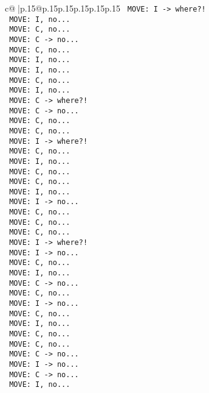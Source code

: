 \documentclass{article}
\begin{document}
{\begin{supertabular}{c@{$\;$}|p{.15\linewidth}@{}p{.15\linewidth}p{.15\linewidth}p{.15\linewidth}p{.15\linewidth}p{.15\linewidth}}
{{{\texttt{ MOVE: I {-}> where?!} \\
\texttt{ MOVE: I, no...} \\
\texttt{ MOVE: C, no...} \\
\texttt{ MOVE: C {-}> no...} \\
\texttt{ MOVE: C, no...} \\
\texttt{ MOVE: I, no...} \\
\texttt{ MOVE: I, no...} \\
\texttt{ MOVE: C, no...} \\
\texttt{ MOVE: I, no...} \\
\texttt{ MOVE: C {-}> where?!} \\
\texttt{ MOVE: C {-}> no...} \\
\texttt{ MOVE: C, no...} \\
\texttt{ MOVE: C, no...} \\
\texttt{ MOVE: I {-}> where?!} \\
\texttt{ MOVE: C, no...} \\
\texttt{ MOVE: I, no...} \\
\texttt{ MOVE: C, no...} \\
\texttt{ MOVE: C, no...} \\
\texttt{ MOVE: I, no...} \\
\texttt{ MOVE: I {-}> no...} \\
\texttt{ MOVE: C, no...} \\
\texttt{ MOVE: C, no...} \\
\texttt{ MOVE: C, no...} \\
\texttt{ MOVE: I {-}> where?!} \\
\texttt{ MOVE: I {-}> no...} \\
\texttt{ MOVE: C, no...} \\
\texttt{ MOVE: I, no...} \\
\texttt{ MOVE: C {-}> no...} \\
\texttt{ MOVE: C, no...} \\
\texttt{ MOVE: I {-}> no...} \\
\texttt{ MOVE: C, no...} \\
\texttt{ MOVE: I, no...} \\
\texttt{ MOVE: C, no...} \\
\texttt{ MOVE: C, no...} \\
\texttt{ MOVE: C {-}> no...} \\
\texttt{ MOVE: I {-}> no...} \\
\texttt{ MOVE: C {-}> no...} \\
\texttt{ MOVE: I, no...} \\
}}}
\end{supertabular}}
\end{document}

